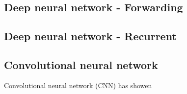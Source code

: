 \subsection{Deep neural network - Forwarding}
\subsection{Deep neural network - Recurrent}
\subsection{Convolutional neural network}
Convolutional neural network (CNN) has showen